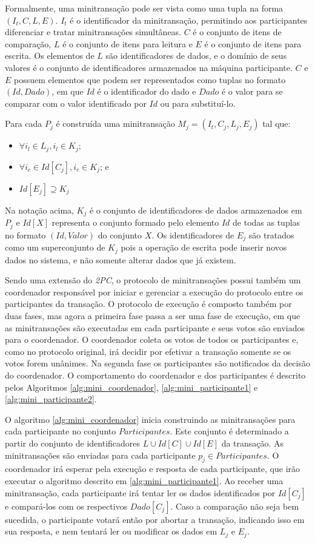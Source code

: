 \documentclass[11pt,twoside,a4paper]{book}
\begin{document}
Formalmente, uma minitransação pode ser vista como uma tupla na forma $(I_t, C, L, E)$. $I_t$ é o identificador da minitransação, permitindo aos participantes diferenciar e tratar minitransações simultâneas. \(C\) é o conjunto de itens de comparação, \(L\) é o conjunto de itens para leitura e \(E\) é o conjunto de itens para escrita. Os elementos de \(L\) são identificadores de dados, e o domínio de seus valores é o conjunto de identificadores armazenados na máquina participante. \(C\) e \(E\) possuem elementos que podem ser representados como tuplas no formato \((Id, Dado)\), em que \(Id\) é o identificador do dado e \(Dado\) é o valor para se comparar com o valor identificado por $Id$ ou para substituí-lo.

Para cada \(P_j\) é construída uma minitransação \(M_j = (I_t, C_j, L_j, E_j)\) tal que:

\begin{itemize}
\item $\forall i_l \in L_j, i_l \in K_j$;
\item $\forall i_c \in Id[C_j], i_c \in K_j$; e
\item $Id[E_j] \supseteq K_j$
\end{itemize}

Na notação acima, $K_j$ é o conjunto de identificadores de dados armazenados em $P_j$ e $Id[X]$ representa o conjunto formado pelo elemento $Id$ de todas as tuplas no formato $(Id, Valor)$ do conjunto $X$. Os identificadores de $E_j$ são tratados como um superconjunto de $K_j$ pois a operação de escrita pode inserir novos dados no sistema, e não somente alterar dados que já existem.

Sendo uma extensão do \emph{2PC}, o protocolo de minitransações possui também um coordenador responsável por iniciar e gerenciar a execução do protocolo entre os participantes da transação. O protocolo de execução é composto também por duas fases, mas agora a primeira fase passa a ser uma fase de execução, em que as minitransações são executadas em cada participante e seus votos são enviados para o coordenador. O coordenador coleta os votos de todos os participantes e, como no protocolo original, irá decidir por efetivar a transação somente se os votos forem unânimes. Na segunda fase os participantes são notificados da decisão do coordenador. O comportamento do coordenador e dos participantes é descrito pelos Algoritmos \ref{alg:mini_coordenador}, \ref{alg:mini_participante1} e \ref{alg:mini_participante2}.

O algoritmo \ref{alg:mini_coordenador} inicia construindo as minitransações para cada participante no conjunto $Participantes$. Este conjunto é determinado a partir do conjunto de identificadores $L \cup Id[C] \cup Id[E]$ da transação. As minitransações são enviadas para cada participante $p_j \in Participantes$. O coordenador irá esperar pela execução e resposta de cada participante, que irão executar o algoritmo descrito em \ref{alg:mini_participante1}. Ao receber uma minitransação, cada participante irá tentar ler os dados identificados por $Id[C_j]$ e compará-los com os respectivos $Dado[C_j]$. Caso a comparação não seja bem sucedida, o participante votará então por abortar a transação, indicando isso em sua resposta, e nem tentará ler ou modificar os dados em $L_j$ e $E_j$.
\end{document}
